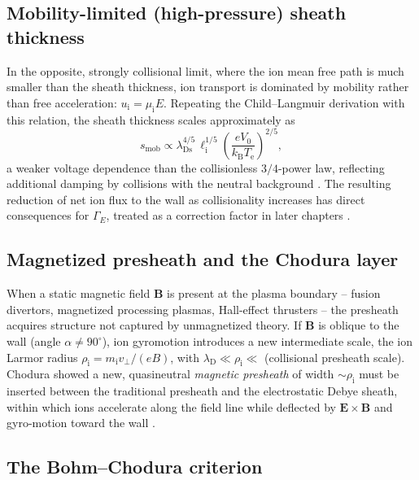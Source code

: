 \subsection{Mobility-limited (high-pressure) sheath thickness}

In the opposite, strongly collisional limit, where the ion mean free path is much smaller than the sheath thickness, ion transport is dominated by mobility rather than free acceleration: $u_{\mathrm{i}} = \mu_{\mathrm{i}} E$. Repeating the Child--Langmuir derivation with this relation, the sheath thickness scales approximately as
\begin{equation}
s_{\mathrm{mob}} \propto \lambda_{\mathrm{Ds}}^{4/5}\, \ell_{\mathrm{i}}^{1/5} \left( \frac{e V_{0}}{k_{\mathrm{B}} T_{\mathrm{e}}} \right)^{2/5},
\end{equation}
a weaker voltage dependence than the collisionless $3/4$-power law, reflecting additional damping by collisions with the neutral background \cite{ref0024}. The resulting reduction of net ion flux to the wall as collisionality increases has direct consequences for $\Gamma_{E}$, treated as a correction factor in later chapters \cite{ref0024}.

\subsection{Magnetized presheath and the Chodura layer}
\label{sec:chodura}

When a static magnetic field $\mathbf{B}$ is present at the plasma boundary -- fusion divertors, magnetized processing plasmas, Hall-effect thrusters -- the presheath acquires structure not captured by unmagnetized theory. If $\mathbf{B}$ is oblique to the wall (angle $\alpha \ne 90^{\circ}$), ion gyromotion introduces a new intermediate scale, the ion Larmor radius $\rho_{\mathrm{i}} = m_{\mathrm{i}} v_{\perp}/(eB)$, with $\lambda_{\mathrm{D}} \ll \rho_{\mathrm{i}} \ll$ (collisional presheath scale). Chodura showed a new, quasineutral \emph{magnetic presheath} of width $\sim \rho_{\mathrm{i}}$ must be inserted between the traditional presheath and the electrostatic Debye sheath, within which ions accelerate along the field line while deflected by $\mathbf{E}\times\mathbf{B}$ and gyro-motion toward the wall \cite{ref0017,ref0018}.

\subsection{The Bohm--Chodura criterion}

